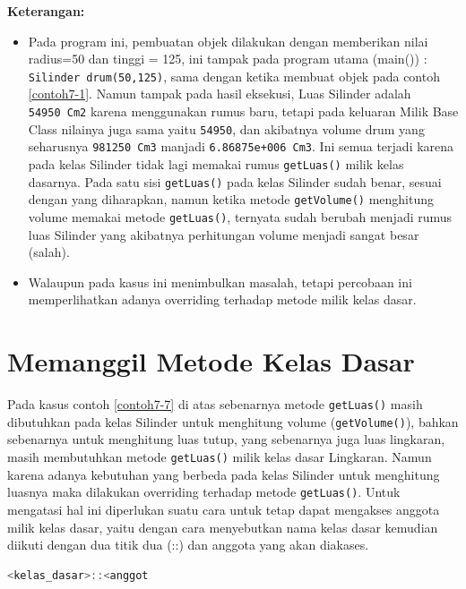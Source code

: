 \textbf{Keterangan:}

\begin{itemize}

\item
  Pada program ini, pembuatan objek dilakukan dengan memberikan nilai
  radius=50 dan tinggi = 125, ini tampak pada program utama (main()) :
  \texttt{Silinder\ drum(50,125)}, sama dengan ketika membuat objek pada
  contoh \ref{contoh7-1}. Namun tampak pada hasil eksekusi, Luas Silinder adalah
  \texttt{54950\ Cm2} karena menggunakan rumus baru, tetapi pada
  keluaran Milik Base Class nilainya juga sama yaitu \texttt{54950}, dan
  akibatnya volume drum yang seharusnya \texttt{981250\ Cm3} manjadi
  \texttt{6.86875e+006\ Cm3}. Ini semua terjadi karena pada kelas
  Silinder tidak lagi memakai rumus \texttt{getLuas()} milik kelas
  dasarnya. Pada satu sisi \texttt{getLuas()} pada kelas Silinder sudah
  benar, sesuai dengan yang diharapkan, namun ketika metode
  \texttt{getVolume()} menghitung volume memakai metode
  \texttt{getLuas()}, ternyata sudah berubah menjadi rumus luas Silinder
  yang akibatnya perhitungan volume menjadi sangat besar (salah).
\item
  Walaupun pada kasus ini menimbulkan masalah, tetapi percobaan ini
  memperlihatkan adanya overriding terhadap metode milik kelas dasar.
\end{itemize}

\section{Memanggil Metode Kelas
Dasar}\label{memanggil-metode-kelas-dasar}

Pada kasus contoh \ref{contoh7-7} di atas sebenarnya metode \texttt{getLuas()} masih
dibutuhkan pada kelas Silinder untuk menghitung volume
(\texttt{getVolume()}), bahkan sebenarnya untuk menghitung luas tutup,
yang sebenarnya juga luas lingkaran, masih membutuhkan metode
\texttt{getLuas()} milik kelas dasar Lingkaran. Namun karena adanya
kebutuhan yang berbeda pada kelas Silinder untuk menghitung luasnya maka
dilakukan overriding terhadap metode \texttt{getLuas()}. Untuk mengatasi
hal ini diperlukan suatu cara untuk tetap dapat mengakses anggota milik
kelas dasar, yaitu dengan cara menyebutkan nama kelas dasar kemudian
diikuti dengan dua titik dua (::) dan anggota yang akan diakases.

\begin{lstlisting}[language=c++, numbers=none]
<kelas_dasar>::<anggot
\end{lstlisting}


